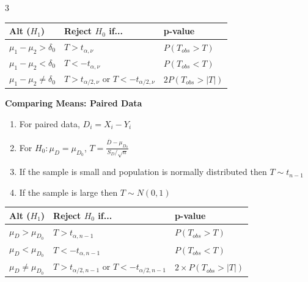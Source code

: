 \documentclass[10pt, landscape]{article}
\begin{document}
\begin{multicols*}{3}
\begin{center}
\renewcommand{\arraystretch}{1.8}
\small
\begin{tabular}{|l|l|l|}
\hline
\textbf{Alt ($H_1$)} & \textbf{Reject $H_0$ if...} & \textbf{p-value} \\ \hline
$\mu_1 - \mu_2 > \delta_0$ & $T > t_{\alpha, \nu}$ & $P(T_{obs} > T)$ \\ \hline
$\mu_1 - \mu_2 < \delta_0$ & $T < -t_{\alpha, \nu}$ & $P(T_{obs} < T)$ \\ \hline
$\mu_1 - \mu_2 \neq \delta_0$ & $T > t_{\alpha/2, \nu}$ or $T < -t_{\alpha/2, \nu}$ & $2P(T_{obs} > |T|)$ \\ \hline
\end{tabular}
\end{center}

\textbf{Comparing Means: Paired Data}
\begin{enumerate}
    \item For paired data, $D_i=X_i-Y_i$
    \item For $H_0:\mu_D=\mu_{D_0}$, $T=\frac{\overline{D}-\mu_{D_0}}{S_D/\sqrt{n}}$
    \item If the sample is small and population is normally distributed then $T\sim t_{n-1}$
    \item If the sample is large then $T \sim N(0, 1)$
\end{enumerate}

\begin{center}
\renewcommand{\arraystretch}{1.8}
\small
\begin{tabular}{|l|l|l|}
\hline
\textbf{Alt ($H_1$)} & \textbf{Reject $H_0$ if...} & \textbf{p-value} \\ \hline
$\mu_D > \mu_{D_0}$ & $T > t_{\alpha, n-1}$ & $P(T_{obs} > T)$ \\ \hline
$\mu_D < \mu_{D_0}$ & $T < -t_{\alpha, n-1}$ & $P(T_{obs} < T)$ \\ \hline
$\mu_D \neq \mu_{D_0}$ & $T > t_{\alpha/2, n-1}$ or $T < -t_{\alpha/2, n-1}$ & $2 \times P(T_{obs} > |T|)$ \\ \hline
\end{tabular}
\end{center}

\end{multicols*}
\end{document}
